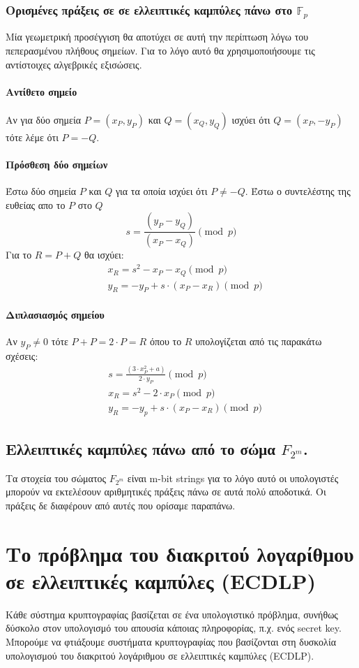 \documentclass[12pt]{article}
\begin{document}
\subsubsection{Ορισμένες πράξεις σε σε ελλειπτικές καμπύλες πάνω στο $\mathbb{F}_p$}
Μία γεωμετρική προσέγγιση θα αποτύχει σε αυτή την περίπτωση λόγω του πεπερασμένου πλήθους σημείων. Για το λόγο αυτό θα χρησιμοποιήσουμε τις αντίστοιχες αλγεβρικές εξισώσεις.
\paragraph{Αντίθετο σημείο}
Αν για δύο σημεία $P = (x_P, y_P)$ και $Q = (x_Q, y_Q)$ ισχύει ότι $Q = (x_P, -y_P)$ τότε λέμε ότι $P = -Q$. 
\paragraph{Πρόσθεση δύο σημείων}
 Έστω δύο σημεία $P$ και $Q$ για τα οποία ισχύει ότι $P \neq -Q$.
 Έστω ο συντελέστης της ευθείας απο το $P$ στο $Q$ $$s = \frac{(y_P - y_Q)}{(x_P - x_Q)}  \pmod p$$
 Για το $R = P + Q$ θα ισχύει:
 \begin{align*}
 & x_R = s^2 - x_P - x_Q \pmod p \\
 & y_R = -y_P + s \cdot (x_P - x_R) \pmod p
 \end{align*}
 \paragraph{Διπλασιασμός σημείου}
  Αν $y_P \neq 0$ τότε $P + P = 2 \cdot P = R$ όπου το $R$ υπολογίζεται από τις παρακάτω σχέσεις:
  \begin{align*}
  & s = \frac{(3 \cdot x^2_P + a)}{2 \cdot y_P} \pmod p \\
  & x_R = s^2 - 2 \cdot x _P \pmod p \\
  & y_R = -y_p + s \cdot (x_P - x_R) \pmod p
  \end{align*}
\subsection{Ελλειπτικές καμπύλες πάνω από το σώμα $F_{2^m}$.}
  Τα στοχεία του σώματος $F_{2^m}$ είναι m-bit strings για το λόγο αυτό οι υπολογιστές μπορούν να εκτελέσουν αριθμητικές πράξεις πάνω σε αυτά πολύ αποδοτικά. Οι πράξεις δε διαφέρουν από αυτές που ορίσαμε παραπάνω.
 
 \pagebreak
 
\section{Το πρόβλημα του διακριτού λογαρίθμου σε ελλειπτικές καμπύλες (ECDLP)} 
Κάθε σύστημα κρυπτογραφίας βασίζεται σε ένα υπολογιστικό πρόβλημα, συνήθως δύσκολο στον υπολογισμό του απουσία κάποιας πληροφορίας, π.χ. ενός secret key. Μπορούμε να φτιάξουμε συστήματα κρυπτογραφίας που βασίζονται στη δυσκολία υπολογισμού του διακριτού λογάριθμου σε ελλειπτικές καμπύλες (ECDLP).
\end{document}

